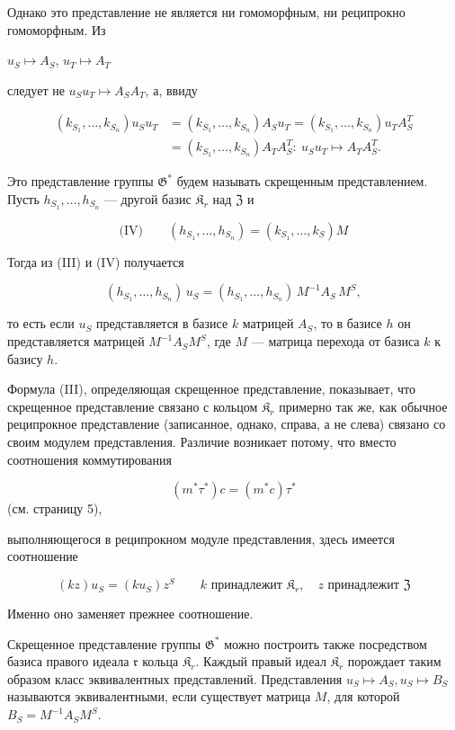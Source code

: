 \documentclass[11pt]{article}
\begin{document}
Однако это представление не является ни гомоморфным, ни реципрокно гомоморфным. Из

\(u_S \mapsto A_S\), \(u_T \mapsto A_T\)

следует не \(u_Su_T \mapsto A_SA_T\), а, ввиду

\[
\begin{aligned}
(k_{S_1}, \ldots, k_{S_n})u_Su_T
&=(k_{S_1}, \ldots, k_{S_n})A_Su_T
=(k_{S_1}, \ldots, k_{S_n})u_TA_S^T\\
&=(k_{S_1}, \ldots, k_{S_n})A_TA_S^T:\ u_Su_T\mapsto A_TA_S^T.
\end{aligned}
\]

Это представление группы \(\mathfrak{G}^*\) будем называть скрещенным представлением. Пусть \(h_{S_1}, \ldots, h_{S_n}\) --- другой базис \(\mathfrak{K}_r\) над \(\mathfrak{Z}\) и

\[
\text{(IV)}\qquad (h_{S_1}, \ldots, h_{S_n}) = (k_{S_1}, \ldots, k_S)M
\]

Тогда из (III) и (IV) получается

\[(h_{S_1},\ldots,h_{S_n})\,u_S=(h_{S_1},\ldots,h_{S_n})\,M^{-1}A_S\,M^S,\]

то есть если \(u_S\) представляется в базисе \(k\) матрицей \(A_S\), то в базисе \(h\) он представляется матрицей \(M^{-1}A_SM^S\), где \(M\) --- матрица перехода от базиса \(k\) к базису \(h\).

Формула (III), определяющая скрещенное представление, показывает, что скрещенное представление связано с кольцом \(\mathfrak K_r\) примерно так же, как обычное реципрокное представление (записанное, однако, справа, а не слева) связано со своим модулем представления. Различие возникает потому, что вместо соотношения коммутирования

\[(m^*\tau^*)c = (m^*c)\tau^*\]
(см. страницу 5),

выполняющегося в реципрокном модуле представления, здесь имеется соотношение

\[
(kz)u_S=(ku_S)z^S\qquad k\text{ принадлежит }\mathfrak K_r,\quad z\text{ принадлежит }\mathfrak Z
\]

Именно оно заменяет прежнее соотношение.

Скрещенное представление группы \(\mathfrak{G}^*\) можно построить также посредством базиса правого идеала \(\mathfrak r\) кольца \(\mathfrak{K}_r\). Каждый правый идеал \(\mathfrak{K}_r\) порождает таким образом класс эквивалентных представлений. Представления \(u_S \mapsto A_S, u_S \mapsto B_S\) называются эквивалентными, если существует матрица \(M\), для которой \(B_S = M^{-1}A_SM^S\).
\end{document}

